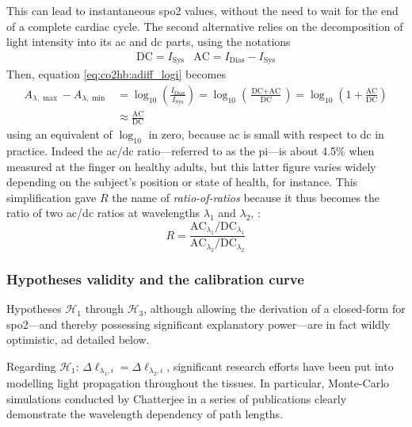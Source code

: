 This can lead to instantaneous \gls{spo2} values, without the need to wait for the end of a complete cardiac cycle\cite{vazquezjaccaud2011}. The second alternative relies on the decomposition of light intensity into its \gls{ac} and \gls{dc} parts, \ie{} using the notations
\begin{eqnarray}
	\text{DC} = I_{\text{Sys}} & \text{AC} = I_{\text{Dias}} - I_{\text{Sys}}
\end{eqnarray}
Then, equation \ref{eq:co2hb:adiff_logi} becomes
\begin{equation}
	\begin{aligned}
		A_{\lambda,\max} - A_{\lambda,\min} &= \log_{10}\left(\frac{I_\text{Dias}}{I_\text{Sys}}\right) = \log_{10} \left( \frac{\text{DC} + \text{AC}}{\text{DC}} \right) = \log_{10} \left(1 + \frac{\text{AC}}{\text{DC}}\right)\\
		&\approx \frac{\text{AC}}{\text{DC}}
	\end{aligned}
\end{equation}
using an equivalent of $\log_{10}$ in zero, because \gls{ac} is small with respect to \gls{dc} in practice. Indeed the \gls{ac}/\gls{dc} ratio---referred to as the \gls{pi}---is about 4.5\% when measured at the finger on healthy adults\cite{tapar2018, fodor2022}, but this latter figure varies widely depending on the subject's position\cite{rathgeber1996, tapar2018} or state of health\cite{sivaprasath2019}, for instance. This simplification gave $R$ the name of \emph{ratio-of-ratios}\cite{nitzan2014} because it thus becomes the ratio of two \gls{ac}/\gls{dc} ratios at wavelengths $\lambda_1$ and $\lambda_2$, \ie{}:
\begin{equation}
	R = \frac{\text{AC}_{\lambda_1} / \text{DC}_{\lambda_1}}{\text{AC}_{\lambda_2} /\text{DC}_{\lambda_2}}
\end{equation}

\subsubsection{Hypotheses validity and the calibration curve}

Hypotheses $\mathcal{H}_1$ through $\mathcal{H}_3$, although allowing the derivation of a closed-form for \gls{spo2}---and thereby possessing significant explanatory power---are in fact wildly optimistic, ad detailed below.

Regarding $\mathcal{H}_1$: $\Delta\ell_{\lambda_1, i} = \Delta\ell_{\lambda_2, i}$, significant research efforts have been put into modelling light propagation throughout the tissues. In particular, Monte-Carlo simulations conducted by Chatterjee \etal{} in a series of publications\cite{chatterjee2017, chatterjee2018, chatterjee2019, chatterjee2020} clearly demonstrate the wavelength dependency of path lengths.


